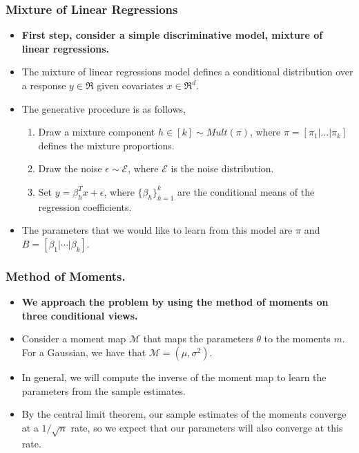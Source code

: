 \documentclass[xcolor={svgnames}]{beamer}
\begin{document}
\begin{frame}
  \frametitle{Mixture of Linear Regressions}

  \begin{itemize}
    \item {\bf First step, consider a simple discriminative model, mixture of linear regressions.}
    \item The mixture of linear regressions model defines a conditional distribution over a response $y \in \Re$ given covariates $x \in \Re^d$.
     \item The generative procedure is as follows,
       \begin{enumerate}
        \item Draw a mixture component $h \in [k] \sim Mult(\pi)$, where $\pi = [\pi_1 | \dots | \pi_k]$ defines the mixture proportions.
        \item Draw the noise $\epsilon \sim \mathcal{E}$, where $\mathcal{E}$ is the noise distribution.
        \item Set $y = \beta_h^T x + \epsilon$, where $\{\beta_h\}_{h=1}^{k}$ are the conditional means of the regression coefficients.
       \end{enumerate}
    \item The parameters that we would like to learn from this model are $\pi$ and $B = [ \beta_1 | \cdots | \beta_k ]$.
  \end{itemize}
\end{frame}

\begin{frame}
  \frametitle{Method of Moments.}

  \begin{itemize}
    \item {\bf We approach the problem by using the method of moments on three conditional views. }
    \item Consider a moment map $\mathcal{M}$ that maps the parameters $\theta$ to the moments $m$. For a Gaussian, we have that $\mathcal{M} = (\mu, \sigma^2)$.
    \item In general, we will compute the inverse of the moment map to learn the parameters from the sample estimates.
    \item By the central limit theorem, our sample estimates of the moments converge at a $1/\sqrt{n}$ rate, so we expect that our parameters will also converge at this rate.
  \end{itemize}
\end{frame}
\end{document}
